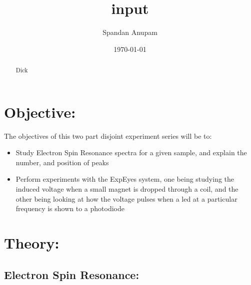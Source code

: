 \documentclass{../_layouts/ieeeconf}
\begin{document}
\title{input}

\author{Spandan Anupam}

\date{\today}
\maketitle

\begin{abstract}
Dick

\end{abstract}
\section{Objective:}
The objectives of this two part disjoint experiment series will be to:

\begin{itemize}
\tightlist
\item
Study Electron Spin Resonance spectra for a given sample, and explain the number, and position of peaks
\item
Perform experiments with the ExpEyes system, one being studying the induced voltage when a small magnet is dropped through a coil, and the other being looking at how the voltage pulses when a led at a particular frequency is shown to a photodiode
\end{itemize}
\section{Theory:}
\subsection{Electron Spin Resonance:}
\end{document}
